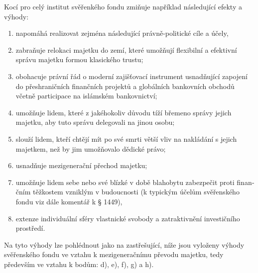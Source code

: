 \documentclass{article}
\begin{document}


Kocí pro celý institut svěřenkého fondu zmiňuje například následující efekty a výhody:\\

\begin{enumerate}[label=\alph*)]
\item napomáhá realizovat zejména následující právně-politické cíle a účely,
\item zabraňuje relokaci majetku do zemí, které umožňují flexibilní a efektivní správu majetku formou klasického trustu;
\item obohacuje právní řád o moderní zajišťovací instrument usnadňující zapojení do přeshraničních finančních projektů a globálních bankovních obchodů včetně participace na islámském bankovnictví;
\item umožňuje lidem, které z jakéhokoliv důvodu tíží břemeno správy jejich majetku, aby tuto správu delegovali na jinou osobu;
\item slouží lidem, kteří chtějí mít po své smrti větší vliv na nakládání s jejich majetkem, než by jim umožňovalo dědické právo;
\item usnadňuje mezigenerační přechod majetku;
\item umožňuje lidem sebe nebo své blízké v době blahobytu zabezpečit proti finan­čním těžkostem vzniklým v budoucnosti (k typickým účelům svěřenského fondu viz dále komentář k § 1449),
\item extenze individuální sféry vlastnické svobody a zatraktivnění investičního prostředí.
\end{enumerate}

Na tyto výhody lze pohlédnout jako na zastřešující, níže jsou vyloženy výhody svěřenského fondu ve vztahu k mezigeneračnímu převodu majetku, tedy především ve vztahu k bodům: d), e), f), g) a h). \\ 
\end{document}
